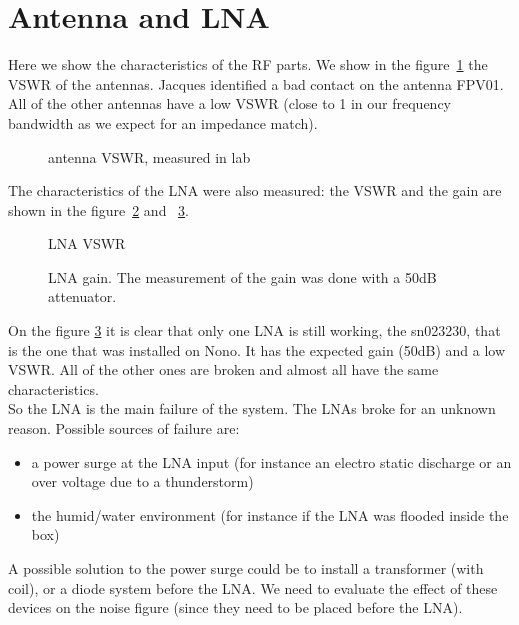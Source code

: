 \section{Antenna and LNA}
Here we  show the  characteristics of  the RF parts.   We show  in the
figure~\ref{fig:vswrant} the VSWR of the antennas. Jacques identified a
bad contact  on the antenna FPV01.   All of the other  antennas have a
low  VSWR (close  to 1  in our
frequency bandwidth as we  expect for  an impedance  match).
\begin{figure}[!ht]
  \centering
  \hspace*{-3ex}
  \caption{antenna VSWR, measured in lab}
  \label{fig:vswrant}
\end{figure}

The characteristics  of the LNA were  also measured: the  VSWR and the
gain are shown in the figure~\ref{fig:lnas11} and ~\ref{fig:lnas21}.

\begin{figure}[!ht]
  \centering
  \hspace*{-3ex}
  \caption{LNA VSWR}
  \label{fig:lnas11}
\end{figure}
\begin{figure}[!ht]
  \centering
  \hspace*{-3ex}
  \caption{LNA gain. The measurement of the gain was done with a 50dB attenuator.}
  \label{fig:lnas21}
\end{figure}

On the figure \ref{fig:lnas21} it is  clear that only one LNA is still
working, the sn023230, that is the  one that was installed on Nono. It
has the expected gain (50dB) and a low VSWR.  All of the other ones are
broken and almost all have the same characteristics.  \\ So the LNA is
the main failure of the system.  The LNAs broke for an unknown reason.
Possible sources of failure are:
\begin{itemize}
\item a power  surge at the LNA input (for  instance an electro static
  discharge or an over voltage due to a thunderstorm)
\item the humid/water environment (for instance if the LNA was flooded
  inside the box)
\end{itemize}

A  possible  solution  to  the  power  surge could  be  to  install  a
transformer (with coil), or a diode  system before the LNA. We need to
evaluate the effect  of these devices on the  noise figure (since they
need to be placed before the LNA).
